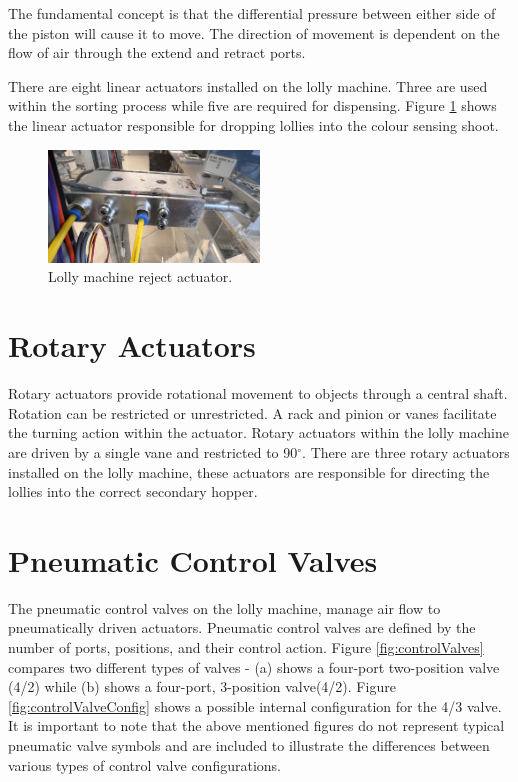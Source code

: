     The fundamental concept is that the differential pressure between either side of the piston will cause it to move\cite{parr2011hydraulics}. The direction of movement is dependent on the flow of air through the extend and retract ports.
    
    There are eight linear actuators installed on the lolly machine. Three are used within the sorting process while five are required for dispensing. Figure \ref{fig:rejectAct} shows the linear actuator responsible for dropping lollies into the colour sensing shoot.

    \begin{figure}[H] 
        \centering
        \includegraphics[width = 0.5\textwidth]{2_images/rejectAct.png}
        \caption{Lolly machine reject actuator.}
        \label{fig:rejectAct}
    \end{figure}        
    
\section{Rotary Actuators}
    Rotary actuators provide rotational movement to objects through a central shaft\cite{parr2011hydraulics}. Rotation can be restricted or unrestricted. A rack and pinion or vanes facilitate the turning action within the actuator\cite{parr2011hydraulics}. Rotary actuators within the lolly machine are driven by a single vane and restricted to 90$^{\circ}$\cite{smcRot}. There are three rotary actuators installed on the lolly machine, these actuators are responsible for directing the lollies into the correct secondary hopper.

\section{Pneumatic Control Valves}
    The pneumatic control valves on the lolly machine, manage air flow to pneumatically driven actuators. Pneumatic control valves are defined by the number of ports, positions, and their control action\cite{parr2011hydraulics}. Figure \ref{fig:controlValves} compares two different types of valves - (a) shows a four-port two-position valve (4/2) while (b) shows a four-port, 3-position valve(4/2). Figure \ref{fig:controlValveConfig} shows a possible internal configuration for the 4/3 valve. It is important to note that the above mentioned figures do not represent typical pneumatic valve symbols and are included to illustrate the differences between various types of control valve configurations.
    
